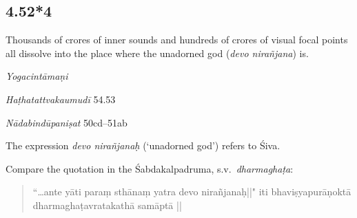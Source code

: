 \begin{ekdosis}

\subsection*{4.52*4}
\begin{translation}[hp04_052_4]
Thousands of crores of inner sounds and hundreds of crores of visual focal points all dissolve into the place where the unadorned god (\emph{devo nirañjana}) is.

\end{translation}


\begin{testimonia}[hp04_052_4]
\emph{Yogacintāmaṇi}
\begin{versinnote}
\end{versinnote}

\emph{Haṭhatattvakaumudī} 54.53
\begin{versinnote}
\end{versinnote}

\emph{Nādabindūpaniṣat} 50cd--51ab
\begin{versinnote}
\end{versinnote}
\end{testimonia}

\begin{philcomm}[hp04_052_4]
The expression \textit{devo nirañjanaḥ} (`unadorned god') refers to Śiva.

Compare the quotation in the Śabdakalpadruma, s.v.~\emph{dharmaghaṭa}:
\begin{quote}
“\dots ante yāti paraṃ sthānaṃ yatra devo nirañjanaḥ||"
iti bhaviṣyapurāṇoktā dharmaghaṭavratakathā samāptā ||
\end{quote}
\end{philcomm}



\end{ekdosis}
